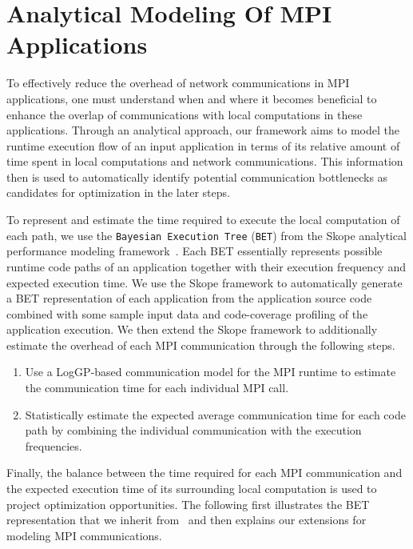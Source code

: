 \section{Analytical Modeling Of MPI Applications}
\label{sec-model}

To effectively reduce the overhead of network communications in MPI
applications, one must understand when and where it becomes beneficial
to enhance the overlap of communications with local computations in
these applications. Through an analytical approach, our
framework aims to model the runtime execution flow of an input
application in terms of its relative amount of time spent in local
computations and network communications.  This information then is
used to automatically identify potential communication bottlenecks as
candidates for optimization in the later steps.

To represent and estimate the time required to execute the local computation of
each path, we use the \texttt{Bayesian Execution Tree} (\texttt{BET})
from the Skope analytical performance modeling
framework~\cite{jichi:ipdps14}.  Each BET essentially represents
possible runtime code paths of an application together with their
execution frequency and expected execution time. We use the Skope
framework to automatically generate a BET representation of each
application from the application source code combined with some sample
input data and code-coverage profiling of the application execution.
We then extend the Skope framework to additionally estimate the
overhead of each MPI communication through the following steps.

\begin{enumerate}

\item Use a LogGP-based communication model for the MPI runtime to
  estimate the communication time for each individual MPI call.

\item Statistically estimate the expected average communication time
  for each code path by combining the individual communication with
  the execution frequencies.

\end{enumerate}

Finally, the balance between the time required for each MPI communication and
the expected execution time of its surrounding local computation is
used to project optimization opportunities. The following first
illustrates the BET representation that we inherit
from~\cite{jichi:ipdps14} and then explains our extensions for
modeling MPI communications.


